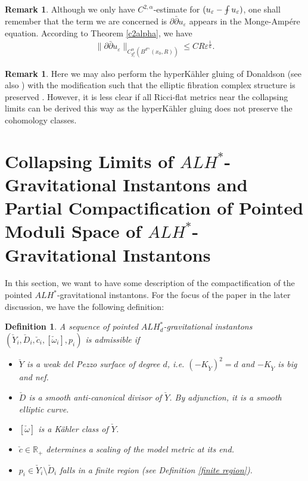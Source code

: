 \documentclass[11pt]{amsart}
\theoremstyle{plain}
\newtheorem{defn}[thm]{Definition}
\theoremstyle{definition}
\newtheorem{rk}[thm]{Remark}
\numberwithin{equation}{section}
\renewcommand{\leq}{\leqslant}
\renewcommand{\epsilon}{\varepsilon}
\def\Xint#1{\mathchoice
   {\XXint\displaystyle\textstyle{#1}}%
   {\XXint\textstyle\scriptstyle{#1}}%
   {\XXint\scriptstyle\scriptscriptstyle{#1}}%
   {\XXint\scriptscriptstyle\scriptscriptstyle{#1}}%
   \!\int}
\def\XXint#1#2#3{{\setbox0=\hbox{$#1{#2#3}{\int}$}
     \vcenter{\hbox{$#2#3$}}\kern-.5\wd0}}
\def\dashint{\Xint-}
\begin{document}
\begin{rk}
Although we only have $C^{2,\alpha}$-estimate for $(u_{\varepsilon}-\dashint u_{\varepsilon})$, one shall remember that the term we are concerned is $\partial\bar{\partial}u_{\varepsilon}$ appears in the Monge-Amp\'ere equation. According to Theorem \ref{c2alpha}, we have 
\begin{align}\label{alpha_est}
\|\partial\bar{\partial}u_{\varepsilon}\|_{C^{\alpha}_{g^a_{\varepsilon}}(B^{d^{\epsilon_0}}(x_0,R))}\leq CR\varepsilon^{\frac{1}{6}}.
\end{align}
\end{rk}
\begin{rk}
	Here we may also perform the hyperK\"ahler gluing of Donaldson \cite{D2} (see also \cite{Fos}\cite{HSVZ}) with the modification such that the elliptic fibration complex structure is preserved \cite{CVZ}. However, it is less clear if all Ricci-flat metrics near the collapsing limits can be derived this way as the hyperK\"ahler gluing does not preserve the cohomology classes. 
\end{rk}




\section{Collapsing Limits of $ALH^*$-Gravitational Instantons and Partial Compactification of Pointed Moduli Space of $ALH^*$-Gravitational Instantons} \label{sec: compactification}
In this section, we want to have some description of the compactification of the pointed $ALH^*$-gravitational instantons.
 For the focus of the paper in the later discussion, we have the following definition: 
\begin{defn}
	A sequence of pointed $ALH^*_d$-gravitational instantons $(\check{Y}_i,\check{D}_i,\check{c}_i,[\check{\omega}_i],p_i)$ is admissible if 
		 \begin{itemize}
			\item $\check{Y}$ is a weak del Pezzo surface of degree $d$, i.e. $(-K_{\check{Y}})^2=d$ and $-K_{\check{Y}}$ is big and nef. 
		\item $\check{D}$ is a smooth anti-canonical divisor of $\check{Y}$. By adjunction, it is a smooth elliptic curve. 
		\item $[\check{\omega}]$ is a K\"ahler class of $\check{Y}$. 
		\item $\check{c}\in \mathbb{R}_+$ determines a scaling of the model metric at its end. 
		\item $p_i\in \check{Y}_i\setminus \check{D}_i$ falls in a finite region (see Definition \ref{finite region}). 
	\end{itemize}
\end{defn}
\end{document}

